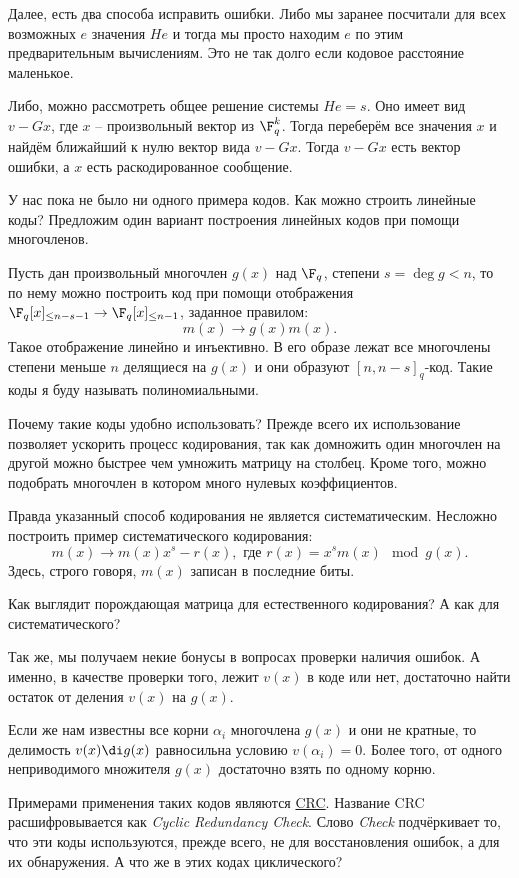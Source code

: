 Далее, есть два способа исправить ошибки. Либо мы заранее посчитали для всех возможных $e$ значения $He$ и тогда мы просто находим $e$ по этим предварительным вычислениям. Это не так долго если кодовое расстояние маленькое. 

Либо, можно рассмотреть общее решение системы $He=s$. Оно имеет вид $v-Gx$, где $x$ -- произвольный вектор из $\F_q^k$. Тогда переберём все значения $x$ и найдём ближайший к нулю вектор вида $v-Gx$. Тогда $v-Gx$ есть вектор ошибки, а $x$ есть раскодированное сообщение.

У нас пока не было ни одного примера кодов. Как можно строить линейные коды? Предложим один вариант построения линейных кодов при помощи многочленов. 

Пусть дан произвольный многочлен $g(x)$ над $\F_q$, степени $s=\deg g < n$, то по нему можно построить код при помощи отображения $\F_q[x]_{\leq n-s-1} \to \F_q[x]_{\leq n-1}$, заданное правилом:
$$m(x) \to g(x)m(x).$$
Такое отображение линейно и инъективно. В его образе лежат все многочлены степени меньше $n$ делящиеся на $g(x)$ и они образуют $[n,n-s]_q$-код. Такие коды я буду называть полиномиальными. 

Почему такие коды удобно использовать? Прежде всего их использование позволяет ускорить процесс кодирования, так как домножить один многочлен на другой можно быстрее чем умножить матрицу на столбец. Кроме того, можно подобрать многочлен в котором много нулевых коэффициентов.

Правда указанный способ кодирования не является систематическим. Несложно построить пример систематического кодирования:
$$m(x) \to m(x)x^s-r(x), \text{ где } r(x)=x^s m(x) \mod g(x).$$
Здесь, строго говоря, $m(x)$ записан в последние биты.

\upr Как выглядит порождающая матрица для естественного кодирования? А как для систематического?
\eupr

Так же, мы получаем некие бонусы в вопросах проверки наличия ошибок. А именно, в качестве проверки того, лежит $v(x)$ в коде или нет, достаточно найти остаток от деления $v(x)$ на $g(x)$.   

Если же нам известны все корни $\alpha_i$ многочлена $g(x)$ и они не кратные, то делимость $v(x)\di g(x)$ равносильна условию $v(\alpha_i)=0$. Более того, от одного неприводимого множителя $g(x)$ достаточно взять по одному корню.

Примерами применения таких кодов являются \href{https://ru.wikipedia.org/wiki/%D0%A6%D0%B8%D0%BA%D0%BB%D0%B8%D1%87%D0%B5%D1%81%D0%BA%D0%B8%D0%B9_%D0%B8%D0%B7%D0%B1%D1%8B%D1%82%D0%BE%D1%87%D0%BD%D1%8B%D0%B9_%D0%BA%D0%BE%D0%B4}{CRC}.
Название CRC расшифровывается как {\it Cyclic Redundancy Check}. Слово {\it Check} подчёркивает то, что эти коды используются, прежде всего, не для восстановления ошибок, а для их обнаружения. А что же в этих кодах циклического?

